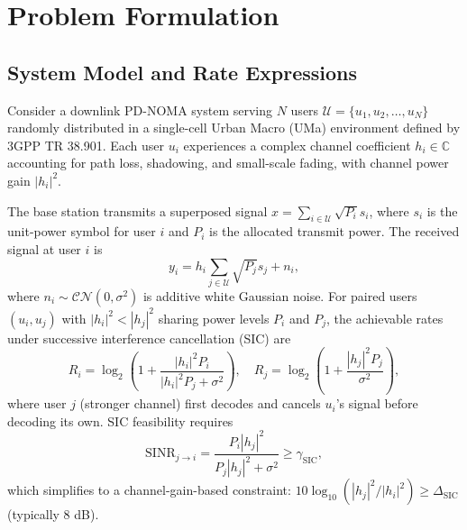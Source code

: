 \section{Problem Formulation}

\subsection{System Model and Rate Expressions}
Consider a downlink PD-NOMA system serving $N$ users $\mathcal{U}=\{u_1,u_2,\dots,u_N\}$ randomly distributed in a single-cell Urban Macro (UMa) environment defined by 3GPP TR 38.901. Each user $u_i$ experiences a complex channel coefficient $h_i \in \mathbb{C}$ accounting for path loss, shadowing, and small-scale fading, with channel power gain $|h_i|^2$. 

The base station transmits a superposed signal $x = \sum_{i\in\mathcal{U}} \sqrt{P_i}s_i$, where $s_i$ is the unit-power symbol for user $i$ and $P_i$ is the allocated transmit power. The received signal at user $i$ is
\begin{equation}
y_i = h_i \sum_{j\in\mathcal{U}} \sqrt{P_j}s_j + n_i,
\end{equation}
where $n_i \sim \mathcal{CN}(0,\sigma^2)$ is additive white Gaussian noise. For paired users $(u_i,u_j)$ with $|h_i|^2 < |h_j|^2$ sharing power levels $P_i$ and $P_j$, the achievable rates under successive interference cancellation (SIC) are
\begin{equation}
R_i = \log_2\!\left(1+\frac{|h_i|^2 P_i}{|h_i|^2 P_j+\sigma^2}\right), \quad
R_j = \log_2\!\left(1+\frac{|h_j|^2 P_j}{\sigma^2}\right),
\end{equation}
where user $j$ (stronger channel) first decodes and cancels $u_i$'s signal before decoding its own. SIC feasibility requires
\begin{equation}
\text{SINR}_{j \to i} = \frac{P_i |h_j|^2}{P_j |h_j|^2 + \sigma^2} \geq \gamma_{\text{SIC}},
\end{equation}
which simplifies to a channel-gain-based constraint: $10\log_{10}(|h_j|^2/|h_i|^2) \geq \Delta_{\text{SIC}}$ (typically 8 dB). 

